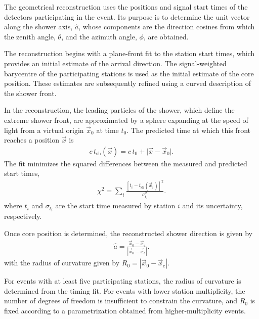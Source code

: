 \documentclass[main.tex]{subfiles}
\begin{document}
The geometrical reconstruction uses the positions and signal start times of the detectors participating in the event.
Its purpose is to determine the unit vector along the shower axis, $\hat{a}$, whose components are the direction cosines from which the zenith angle, $\theta$, and the azimuth angle, $\phi$, are obtained. 

The reconstruction begins with a plane-front fit to the station start times, which provides an initial estimate of the arrival direction.
The signal-weighted barycentre of the participating stations is used as the initial estimate of the core position.
These estimates are subsequently refined using a curved description of the shower front.

In the \Offline reconstruction, the leading particles of the shower, which define the extreme shower front, are approximated by a sphere expanding at the speed of light from a virtual origin $\vec{x}_0$ at time $t_0$.
The predicted time at which this front reaches a position $\vec{x}$ is
\begin{align}
    c\,t_\mathrm{sh}(\vec{x}) = c\,t_0 + \lvert \vec{x}-\vec{x}_0 \rvert .
    \label{eq:spherical_shower_front}
\end{align}
The fit minimizes the squared differences between the measured and predicted start times,
\begin{align}
    \chi^2 = \sum_i \frac{\left[t_i-t_\mathrm{sh}(\vec{x}_i)\right]^2}{\sigma_{t_i}^2}.
    \label{eq:geometry_chi2}
\end{align}
where $t_i$ and $\sigma_{t_i}$ are the start time measured by station $i$ and its uncertainty, respectively.

Once core position is determined, the reconstructed shower direction is given by
\begin{align}
    \hat{a}
    =
    \frac{\vec{x}_{0}-\vec{x}_{\mathrm{c}}}
    {\left|\vec{x}_{0}-\vec{x}_{\mathrm{c}}\right|}.
    \label{eq:shower_axis}
\end{align}
\noindent with the radius of curvature given by $R_{0}=\left|\vec{x}_{0}-\vec{x}_{\mathrm{c}}\right|$.

For events with at least five participating stations, the radius of curvature is determined from the timing fit.
For events with lower station multiplicity, the number of degrees of freedom is insufficient to constrain the curvature, and $R_{0}$ is fixed according to a parametrization obtained from higher-multiplicity events.
\end{document}
